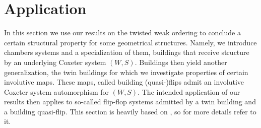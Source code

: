\section{Application}
\label{sec:application}

In this section we use our results on the twisted weak ordering to conclude a certain structural property for some geometrical structures. Namely, we introduce chambers systems and a specialization of them, buildings that receive structure by an underlying Coxeter system $(W,S)$. Buildings then yield another generalization, the twin buildings for which we investigate properties of certain involutive maps. These maps, called building (quasi-)flips admit an involutive Coxeter system automorphism for $(W,S)$. The intended application of our results then applies to so-called flip-flop systems admitted by a twin building and a building quasi-flip. This section is heavily based on \cite{horn:kac-moody}, so for more details refer to it.




